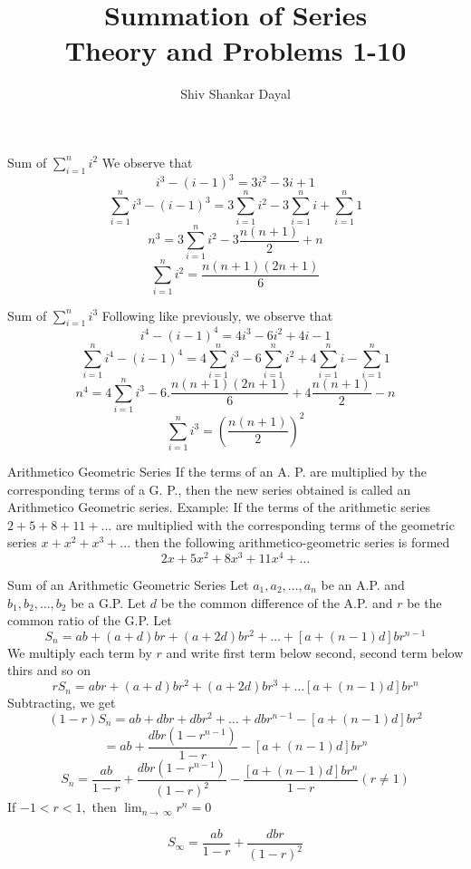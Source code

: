 \documentclass[aspectratio=1610,8pt]{beamer}
\title{Summation of Series\\Theory and Problems 1-10}
\author[Shiv Shankar Dayal]{Shiv Shankar Dayal}
\begin{document}
\begin{frame}
  \titlepage
\end{frame}
\begin{frame}{Sum of $\sum_{i=1}^ni^2$}
  We observe that $$i^3 - (i - 1)^3 = 3i^2 -3i + 1$$
  $$\sum_{i=1}^ni^3 - (i - 1)^3 = 3\sum_{i=1}^ni^2 -3\sum_{i=1}^ni + \sum_{i=1}^n1$$
  $$n^3 = 3\sum_{i=1}^ni^2 - 3\frac{n(n + 1)}{2} + n$$
  $$\sum_{i=1}^ni^2 = \frac{n(n + 1)(2n + 1)}{6}$$
\end{frame}
\begin{frame}{Sum of $\sum_{i=1}^ni^3$}
  Following like previously, we observe that $$i^4 - (i - 1)^4 = 4i^3 - 6i^2 + 4i - 1$$
  $$\sum_{i=1}^ni^4 - (i - 1)^4 = 4\sum_{i=1}^ni^3 - 6\sum_{i=1}^ni^2 + 4\sum_{i=1}^ni - \sum_{i=1}^n1$$
  $$n^4 = 4\sum_{i=1}^ni^3 - 6.\frac{n(n + 1)(2n + 1)}{6} + 4\frac{n(n + 1)}{2} - n$$
  $$\sum_{i=1}^ni^3 = \left(\frac{n(n + 1)}{2}\right)^2$$
\end{frame}
\begin{frame}{Arithmetico Geometric Series}
  If the terms of an A. P. are multiplied by the corresponding terms of a G. P., then the new series obtained is called an
  Arithmetico Geometric series.
  \vspace{5mm}\linebreak
  Example: If the terms of the arithmetic series $2 + 5 + 8 + 11 + ...$ are multiplied with the corresponding terms of the
  geometric series $x + x^2 + x^3 + ...$ then the following arithmetico-geometric series is formed
  $$2x + 5x^2 + 8x^3 + 11x^4 + \ldots$$
\end{frame}
\begin{frame}{Sum of an Arithmetic Geometric Series}
  Let $a_1, a_2, \ldots, a_n$ be an A.P. and $b_1, b_2, \ldots, b_2$ be a G.P. Let $d$ be the common difference of the A.P. and $r$
  be the common ratio of the G.P. Let
  $$S_n = ab + (a + d)br + (a + 2d)br^2 + \ldots + [a + (n - 1)d]br^{n - 1}$$
  We multiply each term by $r$ and write first term below second, second term below thirs and so on
  $$rS_n = abr + (a + d)br^2 + (a + 2d)br^3 + \ldots [a + (n - 1)d]br^n$$
  Subtracting, we get
  $$(1 - r)S_n = ab + dbr + dbr^2 + \ldots + dbr^{n - 1} - [a + (n - 1)d]br^2$$
  $$= ab + \frac{dbr(1 - r^{n - 1})}{1 - r} - [a + (n - 1)d]br^n$$
  $$S_n = \frac{ab}{1 - r} + \frac{dbr(1 - r^{n - 1})}{(1 - r)^2} - \frac{[a + (n - 1)d]br^n}{1 - r} (r\neq 1)$$
  If $-1 < r < 1,$ then $\lim_{n \to ~\infty} r^n = 0$

  $$S_{\infty} = \frac{ab}{1 - r} + \frac{dbr}{(1 - r)^2}$$
\end{frame}
\end{document}
